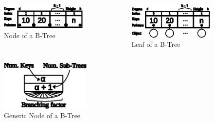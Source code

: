 \documentclass{beamer}
\begin{document}
\begin{frame}
    \framebreak{}
    \begin{columns}
        \begin{column}{0.5\textwidth}
                \begin{figure}
                    \includegraphics[width=\textwidth]{resources/made/single_node.eps}
                    \caption[]{Node of a B-Tree}
                \end{figure}
        \end{column}
        \begin{column}{0.5\textwidth}
                \begin{figure}
                    \includegraphics[width=\textwidth]{resources/made/single_leaf.eps}
                    \caption[]{Leaf of a B-Tree}
                \end{figure}
        \end{column}
    \end{columns}
    \begin{figure}
        \includegraphics[width=0.4\textwidth]{resources/made/single_node_generic.eps}
        \caption[]{Generic Node of a B-Tree}
    \end{figure}
\end{frame}
\end{document}
